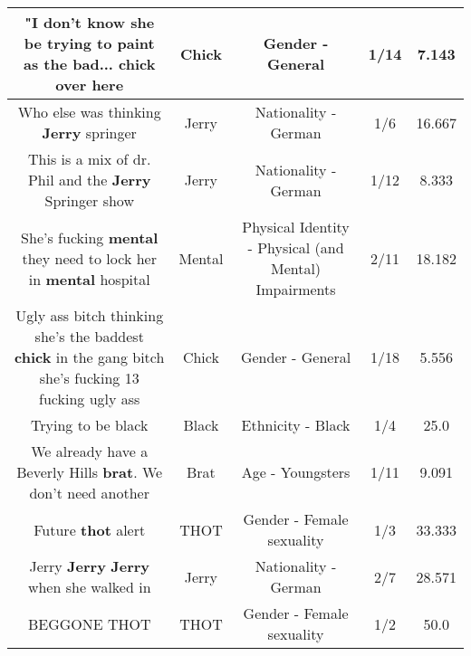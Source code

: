 \documentclass[11pt]{article}
\newlength\mylength
\begin{document}
\begin{center}
\begin{longtable}{|C{.65\mylength}|C{.30\mylength}|C{.12\mylength}|C{.12\mylength}|C{.12\mylength}|}
  \small "I don't know she be trying to paint as the bad... \textbf{chick} over here\normalsize   & Chick & Gender - General & 1/14 & 7.143 \\  \hline
  \small Who else was thinking \textbf{Jerry} springer\normalsize   & Jerry & Nationality - German & 1/6 & 16.667 \\  \hline
  \small This is a mix of dr. Phil and the \textbf{Jerry} Springer show\normalsize   & Jerry & Nationality - German & 1/12 & 8.333 \\  \hline
  \small She's fucking \textbf{mental} they need to lock her in \textbf{mental} hospital\normalsize   & Mental & Physical Identity - Physical (and Mental) Impairments & 2/11 & 18.182 \\  \hline
  \small Ugly ass bitch thinking she's the baddest \textbf{chick} in the gang bitch she's fucking 13 fucking ugly ass\normalsize   & Chick & Gender - General & 1/18 & 5.556 \\  \hline
  \small Trying to be black\normalsize   & Black & Ethnicity - Black & 1/4 & 25.0 \\  \hline
  \small We already have a Beverly Hills \textbf{brat}. We don't need another\normalsize   & Brat & Age - Youngsters & 1/11 & 9.091 \\  \hline
  \small Future \textbf{thot} alert\normalsize   & THOT & Gender - Female sexuality & 1/3 & 33.333 \\  \hline
  \small Jerry \textbf{Jerry} \textbf{Jerry} when she walked in\normalsize   & Jerry & Nationality - German & 2/7 & 28.571 \\  \hline
  \small BEGGONE THOT\normalsize   & THOT & Gender - Female sexuality & 1/2 & 50.0 \\  \hline

\end{longtable}
\end{center}
\end{document}
